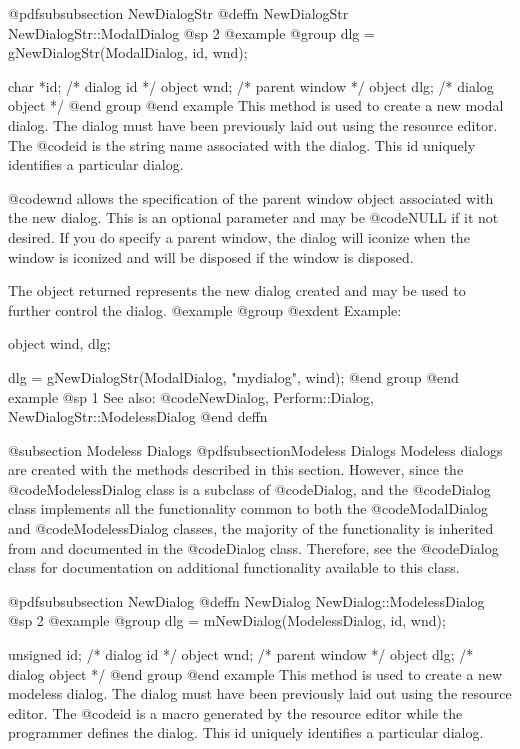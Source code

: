 @pdfsubsubsection {NewDialogStr}
@deffn {NewDialogStr} NewDialogStr::ModalDialog
@sp 2
@example
@group
dlg = gNewDialogStr(ModalDialog, id, wnd);

char      *id;  /*  dialog id      */
object    wnd;  /*  parent window  */
object    dlg;  /*  dialog object  */
@end group
@end example
This method is used to create a new modal dialog.  The dialog must have
been previously laid out using the resource editor.  The @code{id} is
the string name associated with the dialog.  This id uniquely identifies
a particular dialog.

@code{wnd} allows the specification of the parent window object associated
with the new dialog.  This is an optional parameter and may be @code{NULL}
if it not desired.  If you do specify a parent window, the dialog will
iconize when the window is iconized and will be disposed if the window
is disposed.

The object returned represents the new dialog created and may be
used to further control the dialog.
@example
@group
@exdent Example:

object  wind, dlg;

dlg = gNewDialogStr(ModalDialog, "mydialog", wind);
@end group
@end example
@sp 1
See also:  @code{NewDialog, Perform::Dialog, NewDialogStr::ModelessDialog}
@end deffn









@subsection Modeless Dialogs
@pdfsubsection{Modeless Dialogs}
Modeless dialogs are created with the methods described in this section.
However, since the @code{ModelessDialog} class is a subclass of
@code{Dialog}, and the @code{Dialog} class implements all the
functionality common to both the @code{ModalDialog} and
@code{ModelessDialog} classes, the majority of the functionality is
inherited from and documented in the @code{Dialog} class.  Therefore,
see the @code{Dialog} class for documentation on additional
functionality available to this class.




@pdfsubsubsection {NewDialog}
@deffn {NewDialog} NewDialog::ModelessDialog
@sp 2
@example
@group
dlg = mNewDialog(ModelessDialog, id, wnd);

unsigned  id;   /*  dialog id      */
object    wnd;  /*  parent window  */
object    dlg;  /*  dialog object  */
@end group
@end example
This method is used to create a new modeless dialog.  The dialog must have
been previously laid out using the resource editor.  The @code{id}
is a macro generated by the resource editor while the programmer defines
the dialog.  This id uniquely identifies a particular dialog.

